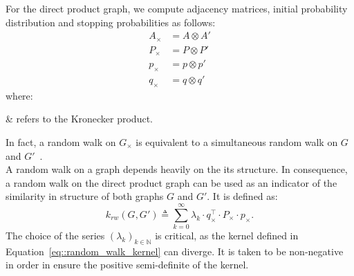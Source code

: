                    For the direct product graph, we compute adjacency matrices, initial probability distribution and stopping probabilities as follows:
                    \begin{align}
                        \label{eq::direct_product_graph_walk}
                        A_{\times} &= A \otimes A'\\
                        P_{\times} &= P \otimes P'\\
                        p_{\times} &= p \otimes p'\\
                        q_{\times} &= q \otimes q'
                    \end{align}
                    where:
                    \begin{conditions}
                        \otimes & refers to the Kronecker product.
                    \end{conditions}
                    In fact, a random walk on $G_{\times}$ is equivalent to a simultaneous random walk on $G$ and $G'$~\parencite{hammack2011handbook}.\\

                    A random walk on a graph depends heavily on the its structure.
                    In consequence, a random walk on the direct product graph can be used as an indicator of the similarity in structure of both graphs $G$ and $G'$.
                    It is defined as:
                    \begin{equation}
                        \label{eq::random_walk_kernel}
                        k_{rw}(G, G') \triangleq \sum_{k=0}^\infty \lambda_k \cdot q_{\times}^\intercal\cdot P_{\times}\cdot p_{\times}.
                    \end{equation}
                    The choice of the series $\left(\lambda_k\right)_{k\in \mathbb{N}}$ is critical, as the kernel defined in Equation~\ref{eq::random_walk_kernel} can diverge.
                    It is taken to be non-negative in order in ensure the positive semi-definite of the kernel.\\

